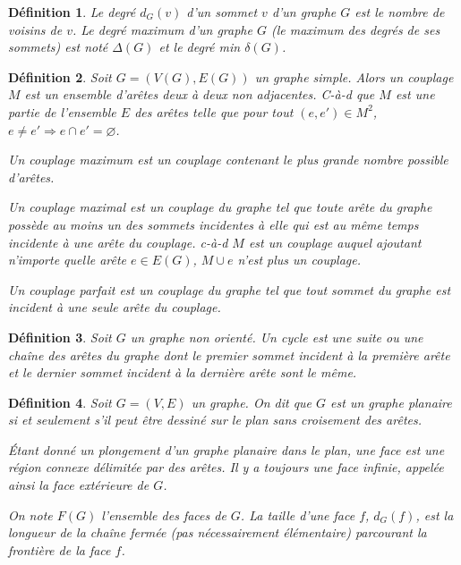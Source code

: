 \documentclass[10pt,a4paper]{article}
\newtheorem{definition}{Définition}
\begin{document}
\begin{definition}
Le \emph{degré} $d_{G}(v)$ d'un sommet $v$ d'un graphe $G$ est le nombre de voisins de $v$. Le degré maximum d'un graphe $G$ (le maximum des degrés de ses sommets) est noté $\Delta(G)$ et le degré min $\delta(G)$.
\end{definition}

\begin{definition}
Soit $G=(V(G),E(G))$ un graphe simple. Alors un \emph{couplage} $M$ est un ensemble d'arêtes deux à deux non adjacentes. C-à-d que $M$ est une partie de l'ensemble $E$ des arêtes telle que pour tout $(e,e') \in M^2$, $e \neq e' \Rightarrow e \cap e' = \varnothing$.

Un \emph{couplage maximum} est un couplage contenant le plus grande nombre possible d'arêtes.

Un \emph{couplage maximal} est un couplage du graphe tel que toute arête du graphe possède au moins un des sommets incidentes à elle qui est au même temps incidente à une arête du couplage. c-à-d $M$ est un couplage auquel ajoutant n'importe quelle arête $e \in E(G)$, $M \cup e$ n'est plus un couplage.

Un \emph{couplage parfait} est un couplage du graphe tel que tout sommet du graphe est incident à une seule arête du couplage.
\end{definition}

\begin{definition}
Soit $G$ un graphe non orienté. Un \emph{cycle} est une suite ou une chaîne des arêtes du graphe dont le premier sommet incident à la première arête et le dernier sommet incident à la dernière arête sont le même.
\end{definition}

\begin{definition}
Soit $G=(V,E)$ un graphe. On dit que $G$ est un graphe \emph{planaire} si et seulement s'il peut être dessiné sur le plan sans croisement des arêtes. 

Étant donné un plongement d'un graphe planaire dans le plan, une \emph{face} est une région connexe délimitée par des arêtes. Il y a toujours une face infinie, appelée ainsi la \emph{face extérieure} de $G$.

On note $F(G)$ l'ensemble des faces de $G$. La \emph{taille} d'une face $f$, $d_G(f)$, est la longueur de la chaîne fermée (pas nécessairement élémentaire) parcourant la frontière de la face $f$.
\end{definition}
\end{document}
